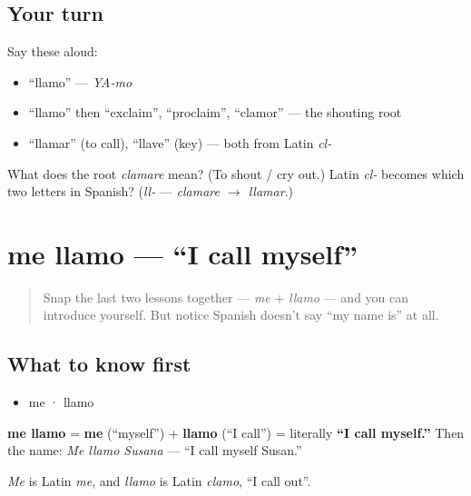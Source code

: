 \subsection*{Your turn}
Say these aloud:

\begin{itemize}
\raggedright
  \item \textquotedblleft{}llamo\textquotedblright{} — \emph{YA-mo}
  \item \textquotedblleft{}llamo\textquotedblright{} then \textquotedblleft{}exclaim\textquotedblright{}, \textquotedblleft{}proclaim\textquotedblright{}, \textquotedblleft{}clamor\textquotedblright{} — the shouting root
  \item \textquotedblleft{}llamar\textquotedblright{} (to call), \textquotedblleft{}llave\textquotedblright{} (key) — both from Latin \emph{cl-}
\end{itemize}

\begin{tcolorbox}[breakable,colback=teal!4,colframe=teal!35!black,title={Before you move on}]
What does the root \emph{clamare} mean? (To shout / cry out.) Latin \emph{cl-} becomes which two letters in Spanish? (\emph{ll-} — \emph{clamare $\to$ llamar}.)
\end{tcolorbox}
\section[me llamo]{me llamo — \textquotedblleft{}I call myself\textquotedblright{}}

\label{lesson:ES-C03-me-llamo}



\begin{quote}
Snap the last two lessons together — \emph{me} + \emph{llamo} — and you can introduce yourself. But notice Spanish doesn't say \textquotedblleft{}my name is\textquotedblright{} at all.
\end{quote}

\subsection*{What to know first}
\begin{itemize}
\raggedright
  \item me · llamo
\end{itemize}

\begin{cousinweb}
\textbf{me llamo} = \textbf{me} (\textquotedblleft{}myself\textquotedblright{}) + \textbf{llamo} (\textquotedblleft{}I call\textquotedblright{}) = literally \textbf{\textquotedblleft{}I call myself.\textquotedblright{}} Then the name: \emph{Me llamo Susana} — \textquotedblleft{}I call myself Susan.\textquotedblright{}

\emph{Me} is Latin \emph{me}, and \emph{llamo} is Latin \emph{clamo}, \textquotedblleft{}I call out\textquotedblright{}.
\end{cousinweb}

